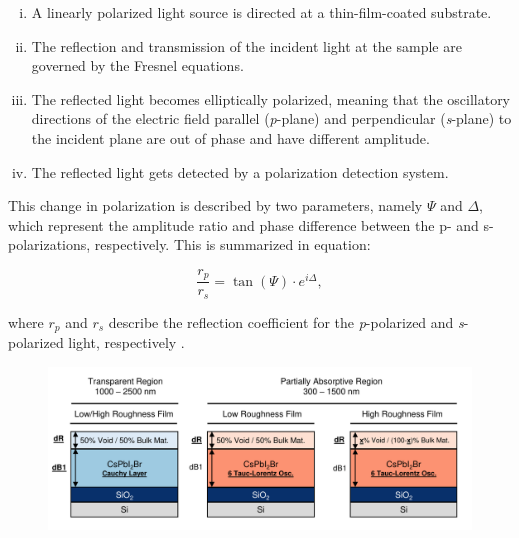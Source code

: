 \begin{enumerate}[i.]
  \item A linearly polarized light source is directed at a thin-film-coated substrate.
  \item The reflection and transmission of the incident light at the sample are governed by the Fresnel equations.
  \item The reflected light becomes elliptically polarized, meaning that the oscillatory directions of the electric field parallel (\textit{p}-plane) and perpendicular (\textit{s}-plane) to the incident plane are out of phase and have different amplitude.
  \item The reflected light gets detected by a polarization detection system.
\end{enumerate}

This change in polarization is described by two parameters, namely $\Psi$ and $\Delta$, which represent the amplitude ratio and phase difference between the p- and s-polarizations, respectively. This is summarized in equation: 

\begin{equation}
\frac{r_p}{r_s} = \tan(\Psi) \cdot e^{i\Delta},
\label{eq:ellipsometry}
\end{equation}

where $r_p$ and $r_s$ describe the reflection coefficient for the \textit{p}-polarized and \textit{s}-polarized light, respectively \cite{Fujiwara2018SpectroscopicCharacterization}.

\begin{figure}{}
  \centering
  \medskip
  \includegraphics[width=.95\textwidth]{chapters/ellipsometry/image/Model_Approach.pdf}
  \caption{}
  \label{fig:ellipsometry:static_models}
\end{figure}

